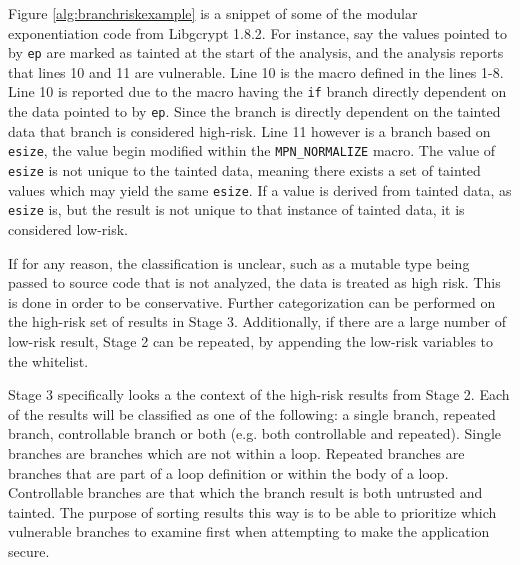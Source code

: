 Figure \ref{alg:branchriskexample} is a snippet of some of the modular
exponentiation code from Libgcrypt 1.8.2. For instance, say the values pointed
to by \texttt{ep} are marked as tainted at the start of the analysis, and the
analysis reports that lines 10 and 11 are vulnerable. Line 10 is the macro
defined in the lines 1-8. Line 10 is reported due to the macro having the
\texttt{if} branch directly dependent on the data pointed to by \texttt{ep}.
Since the branch is directly dependent on the tainted data that branch is
considered high-risk. Line 11 however is a branch based on \texttt{esize}, the
value begin modified within the \texttt{MPN\_NORMALIZE} macro. The value of
\texttt{esize} is not unique to the tainted data, meaning there exists a set of
tainted values which may yield the same \texttt{esize}. If a value is derived
from tainted data, as \texttt{esize} is, but the result is not unique to that
instance of tainted data, it is considered low-risk.

If for any reason, the classification is unclear, such as a mutable type being
passed to source code that is not analyzed, the data is treated as high risk.
This is done in order to be conservative. Further categorization can be
performed on the high-risk set of results in Stage 3. Additionally, if there are
a large number of low-risk result, Stage 2 can be repeated, by appending the
low-risk variables to the whitelist.

Stage 3 specifically looks a the context of the high-risk results from Stage 2.
Each of the results will be classified as one of the following: a single branch, repeated
branch, controllable branch or both (e.g. both controllable and repeated).
Single branches are branches which are not within a loop. Repeated branches are
branches that are part of a loop definition or within the body of a loop.
Controllable branches are that which the branch result is both untrusted and
tainted. The purpose of sorting results this way is to be able to prioritize
which vulnerable branches to examine first when attempting to make the
application secure.
